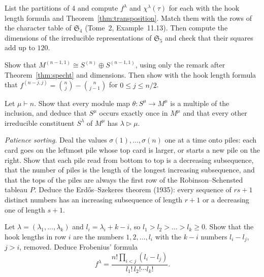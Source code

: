 \begin{exercise}[$\star$]\label{ex:smalltables}
List the partitions of $4$ and compute $f^\lambda$ and $\chi^\lambda(\tau)$ for each with the hook length formula and Theorem~\ref{thm:transposition}. Match them with the rows of the character table of $\mathfrak S_4$ (Tome~2, Example~11.13). Then compute
the dimensions of the irreducible representations of $\mathfrak S_5$ and check that their squares add up to $120$.
\end{exercise}

\begin{exercise}[$\star$]\label{ex:standardrep}
Show that $M^{(n-1,1)}\cong S^{(n)}\oplus S^{(n-1,1)}$, using only the remark after Theorem~\ref{thm:specht} and dimensions. Then show with the hook length formula that $f^{(n-j,j)}=\binom nj-\binom n{j-1}$ for $0\le j\le n/2$.
\end{exercise}

\begin{exercise}[$\star\star$]\label{ex:youngmult}
Let $\mu\vdash n$. Show that every module map $\theta:S^\mu\to M^\mu$ is a multiple of the inclusion, and deduce that $S^\mu$ occurs exactly once in $M^\mu$ and that every other irreducible constituent $S^\lambda$ of $M^\mu$ has $\lambda\triangleright\mu$.
\end{exercise}

\begin{exercise}[$\star\star$]\label{ex:patience}
\emph{Patience sorting.} Deal the values $\sigma(1),\dots,\sigma(n)$ one at a time onto piles: each card goes on the leftmost pile whose top card is larger, or starts a new pile on the right. Show that each pile read from bottom to top is a
decreasing subsequence, that the number of piles is the length of the longest increasing subsequence, and that the tops of the piles are always the first row of the Robinson--Schensted tableau $P$. Deduce the Erdős--Szekeres theorem (1935):
every sequence of $rs+1$ distinct numbers has an increasing subsequence of length $r+1$ or a decreasing one of length $s+1$.
\end{exercise}

\begin{exercise}[$\star\star\star$]\label{ex:frobeniusdim}
Let $\lambda=(\lambda_1,\dots,\lambda_k)$ and $l_i=\lambda_i+k-i$, so $l_1>l_2>\dots>l_k\ge0$. Show that the hook lengths in row $i$ are the numbers $1,2,\dots,l_i$ with the $k-i$ numbers $l_i-l_j$, $j>i$, removed. Deduce Frobenius' formula
\[
f^\lambda=\frac{n!\prod_{i<j}(l_i-l_j)}{l_1!\,l_2!\cdots l_k!}.
\]
\end{exercise}

